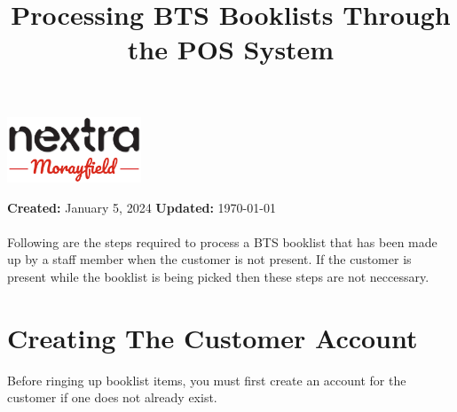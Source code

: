 \documentclass[a4paper, 12pt]{article}
\title{Processing BTS Booklists Through the POS System}
\author{}
\date{}
\begin{document}
\begin{minipage}[t]{1\columnwidth}%
    \begin{flushright}
        \vspace{-0.6in}
        \includegraphics[width=0.3\textwidth]{MonextraNew.png}
        \vspace{0.5in}
    \par\end{flushright}%
\end{minipage}
{\let\newpage\relax\maketitle}

\noindent
\textbf{Created:} January 5, 2024
\hfill
\textbf{Updated:} \today
\\\\\indent
Following are the steps required to process a BTS booklist that has been made up by a staff member when the customer is not present. If the customer is present while the booklist is being picked then these steps are not neccessary.

\tableofcontents

\newpage
\section{Creating The Customer Account}
Before ringing up booklist items, you must first create an account for the customer if one does not already exist.
\end{document}
